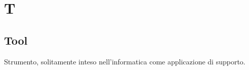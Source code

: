 \section*{T}

\subsection{Tool}
Strumento, solitamente inteso nell'informatica come applicazione di supporto.

